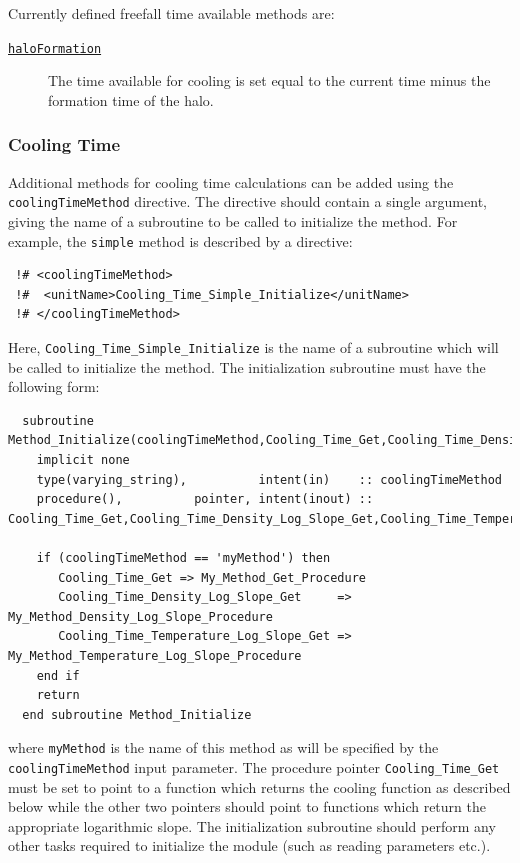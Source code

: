 Currently defined freefall time available methods are:
\begin{description}
 \item [\hyperlink{cooling.freefall_time_available.halo_formation.F90:freefall_times_available_halo_formation:freefall_time_available_halo_formation}{{\tt haloFormation}}] The time available for cooling is set equal to the current time minus the formation time of the halo.
\end{description}

\subsubsection{Cooling Time}

Additional methods for cooling time calculations can be added using the {\tt coolingTimeMethod} directive. The directive should contain a single argument, giving the name of a subroutine to be called to initialize the method. For example, the {\tt simple} method is described by a directive:
\begin{verbatim}
 !# <coolingTimeMethod>
 !#  <unitName>Cooling_Time_Simple_Initialize</unitName>
 !# </coolingTimeMethod>
\end{verbatim}
Here, {\tt Cooling\_Time\_Simple\_Initialize} is the name of a subroutine which will be called to initialize the method. The initialization subroutine must have the following form:
\begin{verbatim}
  subroutine Method_Initialize(coolingTimeMethod,Cooling_Time_Get,Cooling_Time_Density_Log_Slope_Get,Cooling_Time_Temperature_Log_Slope_Get)
    implicit none
    type(varying_string),          intent(in)    :: coolingTimeMethod
    procedure(),          pointer, intent(inout) :: Cooling_Time_Get,Cooling_Time_Density_Log_Slope_Get,Cooling_Time_Temperature_Log_Slope_Get
    
    if (coolingTimeMethod == 'myMethod') then
       Cooling_Time_Get => My_Method_Get_Procedure
       Cooling_Time_Density_Log_Slope_Get     => My_Method_Density_Log_Slope_Procedure
       Cooling_Time_Temperature_Log_Slope_Get => My_Method_Temperature_Log_Slope_Procedure
    end if
    return
  end subroutine Method_Initialize
\end{verbatim}
where {\tt myMethod} is the name of this method as will be specified by the {\tt coolingTimeMethod} input parameter. The procedure pointer {\tt Cooling\_Time\_Get} must be set to point to a function which returns the cooling function as described below while the other two pointers should point to functions which return the appropriate logarithmic slope. The initialization subroutine should perform any other tasks required to initialize the module (such as reading parameters etc.).

